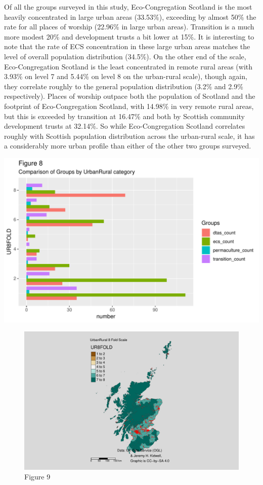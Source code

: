 \documentclass[11pt,]{article}
\begin{document}
Of all the groups surveyed in this study, Eco-Congregation Scotland is
the most heavily concentrated in large urban areas (33.53\%), exceeding
by almost 50\% the rate for all places of worship (22.96\% in large
urban areas). Transition is a much more modest 20\% and development
trusts a bit lower at 15\%. It is interesting to note that the rate of
ECS concentration in these large urban areas matches the level of
overall population distribution (34.5\%). On the other end of the scale,
Eco-Congregation Scotland is the least concentrated in remote rural
areas (with 3.93\% on level 7 and 5.44\% on level 8 on the urban-rural
scale), though again, they correlate roughly to the general population
distribution (3.2\% and 2.9\% respectively). Places of worship outpace
both the population of Scotland and the footprint of Eco-Congregation
Scotland, with 14.98\% in very remote rural areas, but this is exceeded
by transition at 16.47\% and both by Scottish community development
trusts at 32.14\%. So while Eco-Congregation Scotland correlates roughly
with Scottish population distribution across the urban-rural scale, it
has a considerably more urban profile than either of the other two
groups surveyed.

\includegraphics{figures/create_ur_barplot-1.pdf}

\begin{figure}
\centering
\includegraphics{figures/create_urbanrural_ecs_chart_choropleth-1.pdf}
\caption{Figure 9}
\end{figure}
\end{document}
